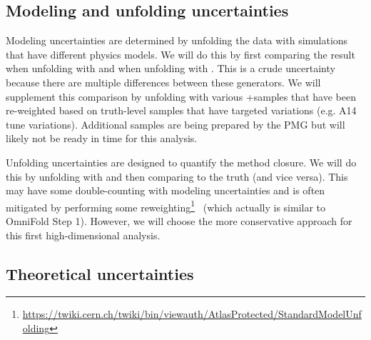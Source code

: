 \subsection{Modeling and unfolding uncertainties}

Modeling uncertainties are determined by unfolding the data with simulations that have different physics models.  We will do this by first comparing the result when unfolding with \pythia and when unfolding with \sherpa.  This is a crude uncertainty because there are multiple differences between these generators.  We will supplement this comparison by unfolding with various \powheg+\pythia samples that have been re-weighted based on truth-level samples that have targeted variations (e.g. A14 tune variations).  Additional samples are being prepared by the PMG but will likely not be ready in time for this analysis.

Unfolding uncertainties are designed to quantify the method closure.  We will do this by unfolding \pythia with \sherpa and then comparing to the \pythia truth (and vice versa).  This may have some double-counting with modeling uncertainties and is often mitigated by performing some reweighting\footnote{\url{https://twiki.cern.ch/twiki/bin/viewauth/AtlasProtected/StandardModelUnfolding}}~\cite{Malaescu:2009dm} (which actually is similar to OmniFold Step 1).  However, we will choose the more conservative approach for this first high-dimensional analysis.


\subsection{Theoretical uncertainties}
